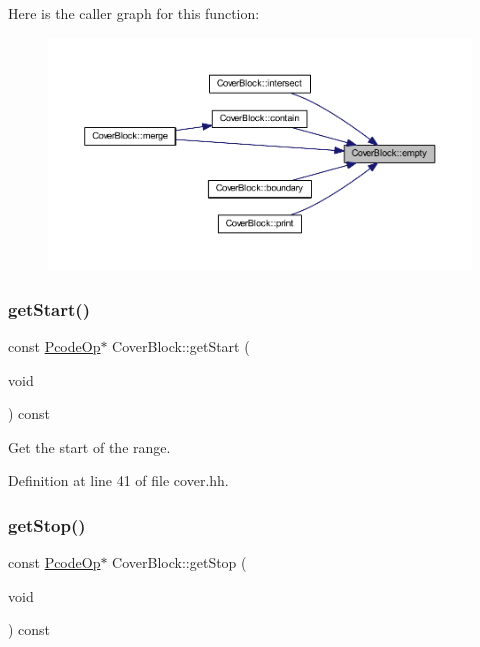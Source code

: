 Here is the caller graph for this function\+:
\nopagebreak
\begin{figure}[H]
\begin{center}
\leavevmode
\includegraphics[width=350pt]{class_cover_block_a2de972d5c460a06fe8340a454423f509_icgraph}
\end{center}
\end{figure}
\mbox{\label{class_cover_block_a9871d2c0a1f58701fc43125de929783e}} 
\subsubsection{\texorpdfstring{getStart()}{getStart()}}
{\footnotesize\ttfamily const \mbox{\hyperlink{class_pcode_op}{Pcode\+Op}}$\ast$ Cover\+Block\+::get\+Start (\begin{DoxyParamCaption}\item[{void}]{ }\end{DoxyParamCaption}) const\hspace{0.3cm}{\ttfamily [inline]}}



Get the start of the range. 



Definition at line 41 of file cover.\+hh.

\mbox{\label{class_cover_block_ad436bf26eddb13766c89480390ec3cc6}} 
\subsubsection{\texorpdfstring{getStop()}{getStop()}}
{\footnotesize\ttfamily const \mbox{\hyperlink{class_pcode_op}{Pcode\+Op}}$\ast$ Cover\+Block\+::get\+Stop (\begin{DoxyParamCaption}\item[{void}]{ }\end{DoxyParamCaption}) const\hspace{0.3cm}{\ttfamily [inline]}}



